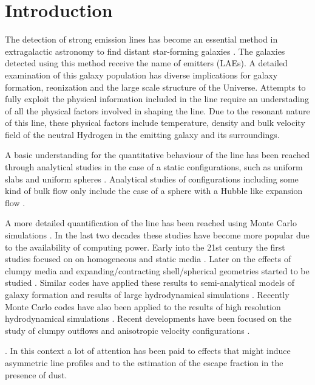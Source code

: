 \documentclass[usenatbib]{mn2e}
\newcommand{\ly}{{\ifmmode{{\rm Ly}\alpha~}\else{Ly$\alpha$~}\fi}}
\begin{document}
\section{Introduction}
\label{sec:intro}

The detection of strong \ly emission lines has become an essential
method in extragalactic astronomy to find distant star-forming
galaxies
\citep{PartridgePeebles,Rhoads00,Gawiser2007,Koehler2007,Ouchi08,Yamada2012,Schenker2012}.
The galaxies detected using this method receive the 
name of \ly emitters (LAEs). A detailed examination of this galaxy
population has diverse implications for galaxy formation, reonization
and the large scale structure of the Universe. Attempts to fully
exploit the physical information included in the \ly line require an
understading of all the physical factors involved in shaping the
line. Due to the resonant nature of this line, these physical factors
include temperature, density and bulk velocity field of the neutral
Hydrogen in the emitting galaxy and its surroundings.


A basic understanding for the quantitative behaviour of the \ly line
has been reached through analytical studies in the case of a static
configurations, such as uniform slabs
\citep{Harrington73,Neufeld90} and  uniform spheres
\citep{Dijkstra06}. Analytical studies of configurations including
some kind of bulk flow only include the case of a sphere with a Hubble
like expansion flow \citep{LoebRybicki}. 

A more detailed quantification of the \ly line has been reached using
Monte Carlo simulations \citep{Auer68,Avery68,Adams72}. In the last
two decades these studies have become more popular due to the
availability of computing power. Early into the 21st century the first
studies focused on on homogeneous and static media
\citep{Ahn00,Ahn01,Zheng02}. Later on the effects of clumpy media
\citep{Hansen06} and expanding/contracting shell/spherical geometries started to
be studied \citep{Verhamme06,Dijkstra06}. Similar codes have applied
these results to semi-analytical models of galaxy formation \citep{Orsi12} and
results of large hydrodynamical simulations
\citep{CLARA,Forero12}. Recently Monte Carlo codes have also
been applied to the results of high resolution hydrodynamical
simulations \citep{Laursen09,Yajima12}. Recent developments have been
focused on the study of clumpy outflows \citep{DijkstraKramer}and
anisotropic velocity configurations \citep{Zheng2013}.

. In this
context a lot of attention has been paid to effects that might induce
asymmetric line profiles and to the estimation of the escape fraction in the presence of dust. 
\end{document}

